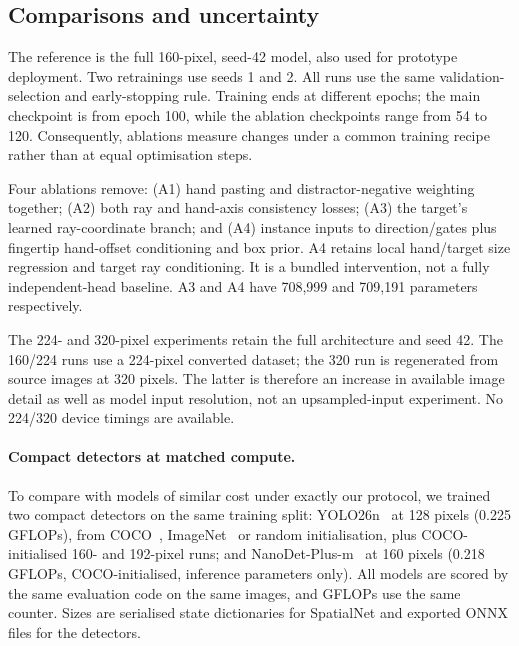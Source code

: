 \subsection{Comparisons and uncertainty}
The reference is the full 160-pixel, seed-42 model, also used for prototype deployment. Two retrainings use seeds 1 and 2. All runs use the same validation-selection and early-stopping rule. Training ends at different epochs; the main checkpoint is from epoch 100, while the ablation checkpoints range from 54 to 120. Consequently, ablations measure changes under a common training recipe rather than at equal optimisation steps.

Four ablations remove: (A1) hand pasting and distractor-negative weighting together; (A2) both ray and hand-axis consistency losses; (A3) the target's learned ray-coordinate branch; and (A4) instance inputs to direction/gates plus fingertip hand-offset conditioning and box prior. A4 retains local hand/target size regression and target ray conditioning. It is a bundled intervention, not a fully independent-head baseline. A3 and A4 have 708,999 and 709,191 parameters respectively.

The 224- and 320-pixel experiments retain the full architecture and seed 42. The 160/224 runs use a 224-pixel converted dataset; the 320 run is regenerated from source images at 320 pixels. The latter is therefore an increase in available image detail as well as model input resolution, not an upsampled-input experiment. No 224/320 device timings are available.

\paragraph{Compact detectors at matched compute.}
To compare with models of similar cost under exactly our protocol, we trained two compact detectors on the same training split: YOLO26n~\cite{ultralytics2026yolo26} at 128 pixels (0.225 GFLOPs), from COCO~\cite{lin2014coco}, ImageNet~\cite{deng2009imagenet} or random initialisation, plus COCO-initialised 160- and 192-pixel runs; and NanoDet-Plus-m~\cite{rangilyu2021nanodet} at 160 pixels (0.218 GFLOPs, COCO-initialised, inference parameters only).  All models are scored by the same evaluation code on the same images, and GFLOPs use the same counter. Sizes are serialised state dictionaries for SpatialNet and exported ONNX files for the detectors.

